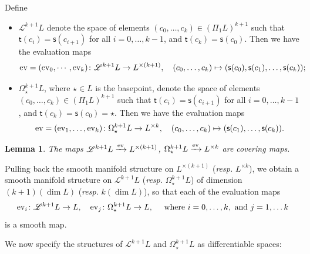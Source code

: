 \documentclass[10pt]{amsart}
\numberwithin{equation}{section}
\theoremstyle{plain}
\newtheorem{lemma}[theorem]{Lemma}
\theoremstyle{definition}
\theoremstyle{remark}
\numberwithin{equation}{section}
\newcommand{\ev}{\textup{ev}}
\begin{document}
{Define 
\begin{itemize}
	\item $\mathscr{L}^{k+1}L$ denote the space of elements $(c_0,\dots, c_k)\in (\Pi_1L)^{k+1}$ such that $\textsf{t}(c_i) = \textsf{s}(c_{i+1})$ for all $i=0,\dots, k-1$, and $\textsf{t}(c_k)=\textsf{s}(c_0)$. 
	Then we have the evaluation maps \[ \ev=(\ev_0,\cdots, \ev_{k})\colon \mathscr{L}^{k+1} L \to L^{\times (k+1)},\quad (c_0,\dots, c_k)\mapsto (\textsf{s}(c_0),\textsf{s}(c_1),\dots, \textsf{s}(c_k)) ;\]
	\item $\Omega^{k+1}_\star L$, where $\star\in L$ is the basepoint, denote the space of elements $(c_0,\dots, c_k)\in (\Pi_1L)^{k+1}$ such that $\textsf{t}(c_i)=\textsf{s}(c_{i+1})$ for all $i=0,\dots, k-1$, and $\textsf{t}(c_k)=\textsf{s}(c_0) = \star$. Then we have the evaluation maps \[ \ev= (\ev_1,\dots, \ev_{k})\colon \Omega^{k+1}_\star L \to L^{\times k} ,\quad (c_0,\dots, c_k) \mapsto (\textsf{s}(c_1),\dots, \textsf{s}(c_k)). \]
\end{itemize}






\begin{lemma}\label{Lm: WangLoopSmooth}
	The maps $\mathscr{L}^{k+1}L\xrightarrow{\ev} L^{\times (k+1)}$, $\Omega^{k+1}_\star L\xrightarrow{\ev} L^{\times k}$ are covering maps.
\end{lemma}


Pulling back the smooth manifold structure on $L^{\times (k+1)}$ (\emph{resp.} $L^{\times k}$), we obtain a smooth manifold structure on $\mathscr{L}^{k+1}L$ (\emph{resp.} $\Omega_\star^{k+1} L$)  of dimension $(k+1)(\dim L)$ (\emph{resp.} $k(\dim L)$), so that each of the evaluation maps \[ \ev_i\colon \mathscr{L}^{k+1}L\to L, \quad \ev_j\colon \Omega_\star^{k+1} L \to L ,\quad\textup{ where } i=0,\dots, k, \textup{ and } j=1,\dots  k  \]
is a smooth map.

We now specify the structures of $\mathscr{L}^{k+1} L$ and $\Omega_\star^{k+1} L$ as differentiable spaces:

}
\end{document}

